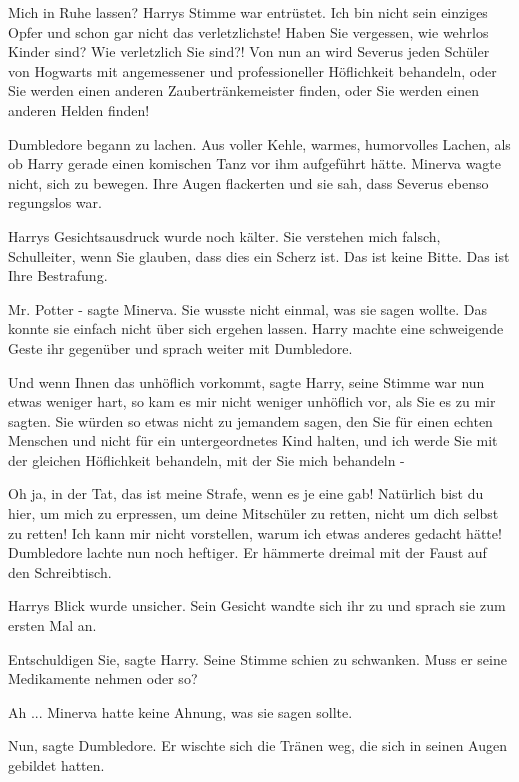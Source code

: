 \glqq{}Mich in Ruhe lassen?\grqq{} Harrys Stimme war entrüstet. \glqq{}Ich bin
nicht sein einziges Opfer und schon gar nicht das verletzlichste! Haben Sie
vergessen, wie wehrlos Kinder sind? Wie verletzlich Sie sind?! Von nun an wird
Severus jeden Schüler von Hogwarts mit angemessener und professioneller
Höflichkeit behandeln, oder Sie werden einen anderen Zaubertränkemeister finden,
oder Sie werden einen anderen Helden finden!\grqq{}

Dumbledore begann zu lachen. Aus voller Kehle, warmes, humorvolles Lachen, als
ob Harry gerade einen komischen Tanz vor ihm aufgeführt hätte. Minerva wagte
nicht, sich zu bewegen. Ihre Augen flackerten und sie sah, dass Severus ebenso
regungslos war.

Harrys Gesichtsausdruck wurde noch kälter. \glqq{}Sie verstehen mich falsch,
Schulleiter, wenn Sie glauben, dass dies ein Scherz ist. Das ist keine Bitte.
Das ist Ihre Bestrafung.\grqq{}

\glqq{}Mr. Potter -\grqq{} sagte Minerva. Sie wusste nicht einmal, was sie sagen
wollte. Das konnte sie einfach nicht über sich ergehen lassen. Harry machte eine
schweigende Geste ihr gegenüber und sprach weiter mit Dumbledore.

\glqq{}Und wenn Ihnen das unhöflich vorkommt\grqq{}, sagte Harry, seine Stimme
war nun etwas weniger hart, \glqq{}so kam es mir nicht weniger unhöflich vor, als
Sie es zu mir sagten. Sie würden so etwas nicht zu jemandem sagen, den Sie für
einen echten Menschen und nicht für ein untergeordnetes Kind halten, und ich
werde Sie mit der gleichen Höflichkeit behandeln, mit der Sie mich behandeln
-\grqq{}

\glqq{}Oh ja, in der Tat, das ist meine Strafe, wenn es je eine gab! Natürlich
bist du hier, um mich zu erpressen, um deine Mitschüler zu retten, nicht um dich
selbst zu retten! Ich kann mir nicht vorstellen, warum ich etwas anderes gedacht
hätte!\grqq{} Dumbledore lachte nun noch heftiger. Er hämmerte dreimal mit der
Faust auf den Schreibtisch.

Harrys Blick wurde unsicher. Sein Gesicht wandte sich ihr zu und sprach sie zum
ersten Mal an.

\glqq{}Entschuldigen Sie\grqq{}, sagte Harry. Seine Stimme schien zu schwanken.
\glqq{}Muss er seine Medikamente nehmen oder so?\grqq{}

\glqq{}Ah ...\grqq{} Minerva hatte keine Ahnung, was sie sagen sollte.

\glqq{}Nun\grqq{}, sagte Dumbledore. Er wischte sich die Tränen weg, die sich in
seinen Augen gebildet hatten.

